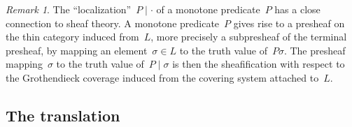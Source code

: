 \documentclass[com,11pt,crcready]{iosart2x}
\theoremstyle{definition}
\theoremstyle{plain}
\theoremstyle{remark}
\newtheorem{remark}[definition]{Remark}
\newcommand{\?}{\,{:}\,}
\renewcommand{\_}{\mathpunct{.}\,}
\begin{document}
\begin{remark}The ``localization''~$P \mid \cdot$ of a monotone predicate~$P$
has a close connection to sheaf theory. A monotone
predicate~$P$ gives rise to a presheaf on the thin category induced from~$L$,
more precisely a subpresheaf of the terminal presheaf, by mapping an
element~$\sigma \in L$ to the truth value of~$P\sigma$. The presheaf
mapping~$\sigma$ to the truth value of~$P \mid \sigma$ is then the
sheafification with respect to the Grothendieck coverage induced from the
covering system attached to~$L$.\end{remark}







\subsection{The translation}\label{sect:translation}
\end{document}

